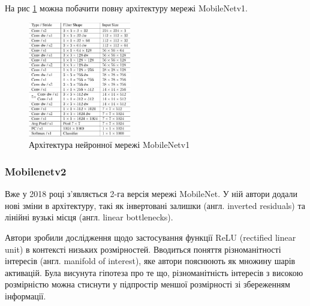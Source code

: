 На рис \ref{fig:cnn:mobilenetv1_architecture} можна побачити повну архітектуру мережі MobileNetv1.

\begin{figure}[H]
    \centering
    \includegraphics[width=0.4\textwidth]{images/cnn_mobilenetv1_architecture}
    \caption{Архітектура нейронної мережі MobileNetv1   \cite{mobilenetv1}
        \label{fig:cnn:mobilenetv1_architecture}
    }
\end{figure}

\subsubsection{Mobilenetv2}

Вже у 2018 році з'являється 2-га версія мережі MobileNet. У ній автори додали нові зміни в
архітектуру, такі як інвертовані залишки (англ. inverted residuals) та 
лінійні вузькі місця (англ. linear bottlenecks).

Автори зробили дослідження щодо застосування функції ReLU (rectified linear unit) в
контексті низьких розмірностей. Вводиться поняття різноманітності інтересів  (англ. manifold of interest), 
яке автори пояснюють як множину шарів активацій. Була висунута гіпотеза про те що,
різноманітність інтересів з високою розмірністю можна стиснути у підпростір меншої розмірності
зі збереженням інформації.

